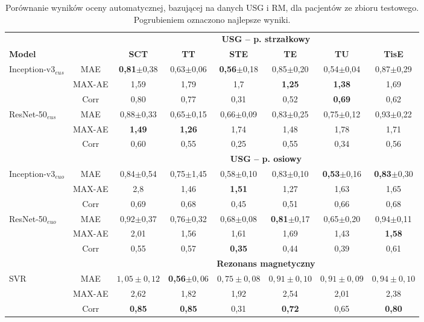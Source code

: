 \renewcommand{\arraystretch}{1.2}
\begin{table}[h]
	\scriptsize
	\setlength{\tabcolsep}{1pt}
	\centering
	\caption{Porównanie wyników oceny automatycznej, bazującej na danych USG i RM, dla pacjentów ze zbioru testowego. Pogrubieniem oznaczono najlepsze wyniki.}
	\label{tab:USGvsRM-cross-validation}
	\vspace{-0.5cm}
	\begin{tabular}{lc||c|c|c|c|c|c}
		& & \multicolumn{6}{c}{\textbf{USG -- p. strzałkowy}} \\
		\textbf{Model} & & \textbf{SCT} & \textbf{TT} & \textbf{STE} & \textbf{TE} & \textbf{TU} & \textbf{TisE} \\ \hline \hline
		Inception-v3$_{eus}$ & MAE & \textbf{0,81}$\pm$0,38 & 0,63$\pm$0,06 & \textbf{0,56}$\pm$0,18 & 0,85$\pm$0,20 & 0,54$\pm$0,04 & 0,87$\pm$0,29 \\
		& MAX-AE & 1,59 & 1,79 & 1,7 & \textbf{1,25} & \textbf{1,38} & 1,69 \\
		& Corr & 0,80 & 0,77 & 0,31 & 0,52 & \textbf{0,69} & 0,62 \\ \hline
		ResNet-50$_{eus}$ & MAE & 0,88$\pm$0,33 & 0,65$\pm$0,15 & 0,66$\pm$0,09 & 0,83$\pm$0,25 & 0,75$\pm$0,12 & 0,93$\pm$0,22 \\
		& MAX-AE & \textbf{1,49} & \textbf{1,26} & 1,74 & 1,48 & 1,78 & 1,71 \\
		& Corr & 0,60 & 0,55 & 0,25 & 0,55 & 0,34 & 0,56 \\
		\hline \hline
		& & \multicolumn{6}{c}{\textbf{USG -- p. osiowy}} \\
		
		Inception-v3$_{euo}$ & MAE & 0,84$\pm$0,54 & 0,75$\pm$1,45 & 0,58$\pm$0,10 & 0,83$\pm$0,10 & \textbf{0,53}$\pm$0,16 & \textbf{0,83}$\pm$0,30 \\
		& MAX-AE & 2,8 & 1,46 & \textbf{1,51} & 1,27 & 1,63 & 1,65 \\
		& Corr & 0,69 & 0,68 & 0,45 & 0,51 & 0,66 & 0,68 \\ \hline
		ResNet-50$_{euo}$ & MAE & 0,92$\pm$0,37 & 0,76$\pm$0,32 & 0,68$\pm$0,08 & \textbf{0,81}$\pm$0,17 & 0,65$\pm$0,20 & 0,94$\pm$0,11 \\
		& MAX-AE & 2,01 & 1,56 & 1,61 & 1,69& 1,43 & \textbf{1,58}\\
		& Corr & 0,55 & 0,57 & \textbf{0,35} & 0,44 & 0,39 & 0,61 \\ \hline \hline
		& & \multicolumn{6}{c}{\textbf{Rezonans magnetyczny}} \\
		
		SVR & MAE & $1,05\pm0,12$ & \textbf{0,56}$\pm0,06$ & $0,75\pm0,08$ & $0,91\pm0,10$ & $0,91\pm0,09$ & $0,94\pm0,10$\\
		& MAX-AE & 2,62 & 1,82 & 1,92 & 2,54 & 2,01 & 2,38 \\
		& Corr   & \textbf{0,85} & \textbf{0,85} & 0,31 & \textbf{0,72} & 0,65 & \textbf{0,80} \\
		 
	\end{tabular}
\end{table}
\renewcommand{\arraystretch}{1}

